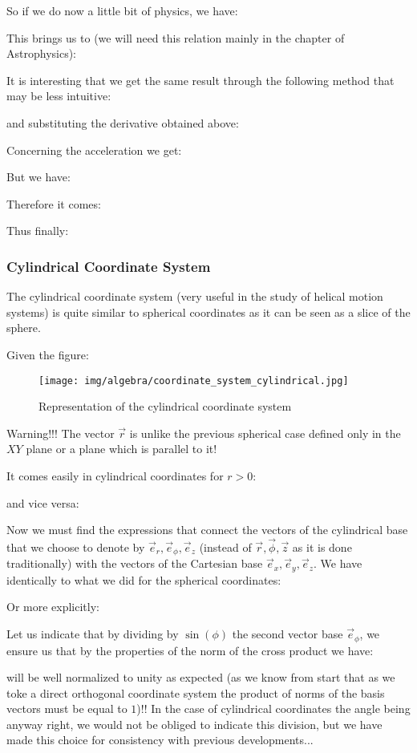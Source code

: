 	So if we do now a little bit of physics, we have:
	
	This brings us to (we will need this relation mainly in the chapter of Astrophysics):
	
	It is interesting that we get the same result through the following method that may be less intuitive:
	
	and substituting the derivative obtained above:
	
	Concerning the acceleration we get:
	
	But we have:
	
	Therefore it comes:
	

	Thus finally:
	
	
	\pagebreak
	\subsubsection{Cylindrical Coordinate System}
	The cylindrical coordinate system (very useful in the study of helical motion systems) is quite similar to spherical coordinates as it can be seen as a slice of the sphere. 

	Given the figure:
	\begin{figure}[H]
		\centering
		\texttt{[image: img/algebra/coordinate\_system\_cylindrical.jpg]}
		\caption{Representation of the cylindrical coordinate system}
	\end{figure}
	Warning!!! The vector $\vec{r}$ is unlike the previous spherical case defined only in the $XY$ plane or a plane which is parallel to it!
	
	It comes easily in cylindrical coordinates for $r>0$:
	
	and vice versa:
	 
	Now we must find the expressions that connect the vectors of the cylindrical base that we choose to denote by $\vec{e}_r,\vec{e}_\phi,\vec{e}_z$ (instead of $\vec{r}, \vec{\phi},\vec{z}$ as it is done traditionally) with the vectors of the Cartesian base $\vec{e}_x,\vec{e}_y,\vec{e}_z$. We have identically to what we did for the spherical coordinates:
	
	Or more explicitly:
	
	Let us indicate that by dividing by $\sin(\phi)$ the second vector base $\vec{e}_\phi$, we ensure us that by the properties of the norm of the cross product we have:
	
	will be well normalized to unity as expected (as we know from start that as we toke a direct orthogonal coordinate system the product of norms of the basis vectors must be equal to $1$)!! In the case of cylindrical coordinates the angle being anyway right, we would not be obliged to indicate this division, but we have made this choice for consistency with previous developments...
	
